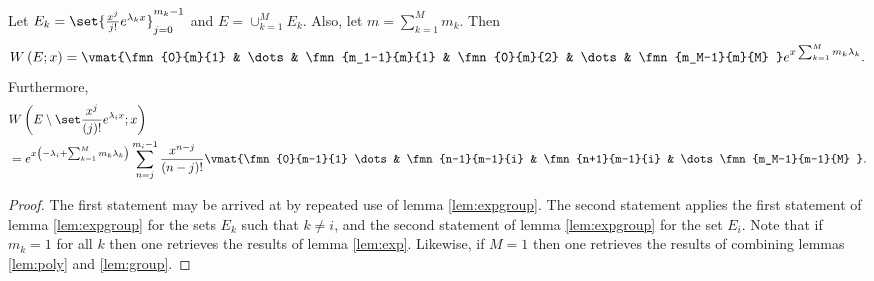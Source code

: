 \documentclass{book}
\begin{document}
\newcommand{\efull}{e^{x \sum_{k=1}^M m_k \lambda_k} }
\newcommand{\eclose}{e^{x \left ( -\lambda_i + \sum_{k=1}^M m_k \lambda_k \right ) } }

\begin{cor}
Let $E_k = \set{\Poly{j} e^{\lambda_k x}}_{j=0}^{m_k-1}$ and $E = \cup_{k=1}^M E_k$.
Also, let $m = \sum_{k=1}^M m_k$.
Then 
\begin{equation*}
\W{E}{x} = \vmat{\fmn{0}{m}{1} & \dots & \fmn{m_1-1}{m}{1} & \fmn{0}{m}{2} & \dots & \fmn{m_M-1}{m}{M} } \efull .
\end{equation*}
Furthermore,
\begin{align*}
& \Wspec{j}{i} \\
& = \eclose \sum_{n=j}^{m_i-1} \poly{n-j} \vmat{\fmn{0}{m-1}{1} \dots & \fmn{n-1}{m-1}{i} & \fmn{n+1}{m-1}{i} & \dots \fmn{m_M-1}{m-1}{M} } .
\end{align*}
\end{cor}

\begin{proof}
The first statement may be arrived at by repeated use of lemma \ref{lem:expgroup}.
The second statement applies the first statement of lemma \ref{lem:expgroup} for the sets $E_k$ such that $k \neq i$, and the second statement of lemma \ref{lem:expgroup} for the set $E_i$.
Note that if $m_k=1$ for all $k$ then one retrieves the results of lemma \ref{lem:exp}.
Likewise, if $M=1$ then one retrieves the results of combining lemmas \ref{lem:poly} and \ref{lem:group}.
\end{proof}
\end{document}
